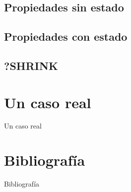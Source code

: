 \documentclass{beamer}
\begin{document}
    \subsection{Propiedades sin estado}
    \subsection{Propiedades con estado}
    \subsection{?SHRINK}
  \section{Un caso real}
    \begin{frame}{Un caso real}

    \end{frame}
  \section{Bibliografía}
    \begin{frame}{Bibliografía}
    \end{frame}
\end{document}
